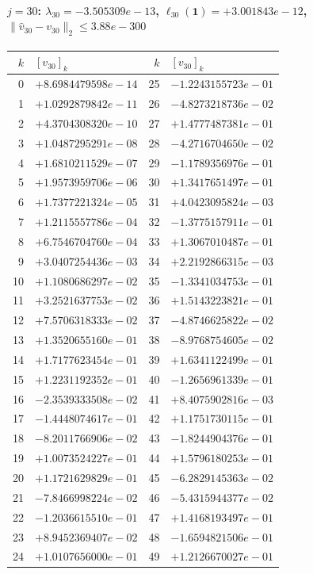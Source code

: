 \paragraph{$j = 30$: $\lambda_{30} = -3.505309e-13$, \quad $\ell_{30}(\mathbf{1}) = +3.001843e-12$, \quad $\|\hat{v}_{30} - v_{30}\|_2 \leq 3.88e-300$}
\begin{center}
{\footnotesize
\begin{tabular}{r@{\;\;}l@{\quad}r@{\;\;}l}
\toprule
$k$ & $[v_{30}]_k$ & $k$ & $[v_{30}]_k$ \\
\midrule
0 & $+8.6984479598e-14$ & 25 & $-1.2243155723e-01$ \\
1 & $+1.0292879842e-11$ & 26 & $-4.8273218736e-02$ \\
2 & $+4.3704308320e-10$ & 27 & $+1.4777487381e-01$ \\
3 & $+1.0487295291e-08$ & 28 & $-4.2716704650e-02$ \\
4 & $+1.6810211529e-07$ & 29 & $-1.1789356976e-01$ \\
5 & $+1.9573959706e-06$ & 30 & $+1.3417651497e-01$ \\
6 & $+1.7377221324e-05$ & 31 & $+4.0423095824e-03$ \\
7 & $+1.2115557786e-04$ & 32 & $-1.3775157911e-01$ \\
8 & $+6.7546704760e-04$ & 33 & $+1.3067010487e-01$ \\
9 & $+3.0407254436e-03$ & 34 & $+2.2192866315e-03$ \\
10 & $+1.1080686297e-02$ & 35 & $-1.3341034753e-01$ \\
11 & $+3.2521637753e-02$ & 36 & $+1.5143223821e-01$ \\
12 & $+7.5706318333e-02$ & 37 & $-4.8746625822e-02$ \\
13 & $+1.3520655160e-01$ & 38 & $-8.9768754605e-02$ \\
14 & $+1.7177623454e-01$ & 39 & $+1.6341122499e-01$ \\
15 & $+1.2231192352e-01$ & 40 & $-1.2656961339e-01$ \\
16 & $-2.3539333508e-02$ & 41 & $+8.4075902816e-03$ \\
17 & $-1.4448074617e-01$ & 42 & $+1.1751730115e-01$ \\
18 & $-8.2011766906e-02$ & 43 & $-1.8244904376e-01$ \\
19 & $+1.0073524227e-01$ & 44 & $+1.5796180253e-01$ \\
20 & $+1.1721629829e-01$ & 45 & $-6.2829145363e-02$ \\
21 & $-7.8466998224e-02$ & 46 & $-5.4315944377e-02$ \\
22 & $-1.2036615510e-01$ & 47 & $+1.4168193497e-01$ \\
23 & $+8.9452369407e-02$ & 48 & $-1.6594821506e-01$ \\
24 & $+1.0107656000e-01$ & 49 & $+1.2126670027e-01$ \\
\bottomrule
\end{tabular}
}
\end{center}

